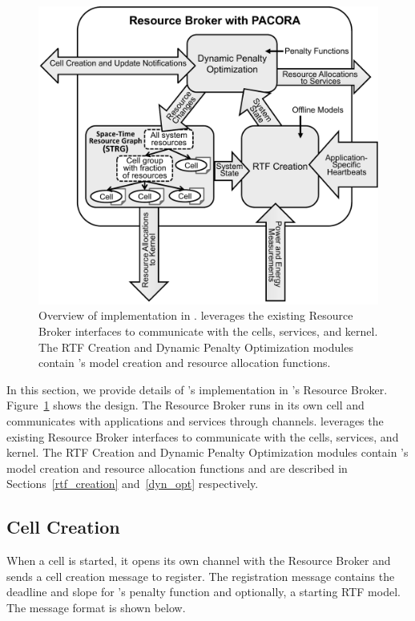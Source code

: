 \begin{figure}[t]
\centering
\includegraphics[width=0.885\linewidth]{Figures/pacora-in-tess}
\caption{
Overview of \pacora implementation in \tess.  \pacora leverages the existing Resource Broker interfaces to communicate with the cells, services, and kernel.  The RTF Creation and Dynamic Penalty Optimization modules contain \pacora's model creation and resource allocation functions.
}
\label{fig:pacora-in-tess}
\end{figure}

In this section, we provide details of \pacora's implementation in \tess's Resource Broker. Figure~\ref{fig:pacora-in-tess} shows the design. The Resource Broker runs in its own cell and communicates with applications and services through channels. \pacora leverages the existing Resource Broker interfaces to communicate with the cells, services, and kernel.  The RTF Creation and Dynamic Penalty Optimization modules contain \pacora's model creation and resource allocation functions and are described in Sections~\ref{rtf_creation} and~\ref{dyn_opt} respectively.

\subsection{Cell Creation}

When a cell is started, it opens its own channel with the Resource Broker and sends a cell creation message to register.
The registration message contains the deadline and slope for \pacora's penalty function and optionally, a starting RTF model.  The message format is shown below.

